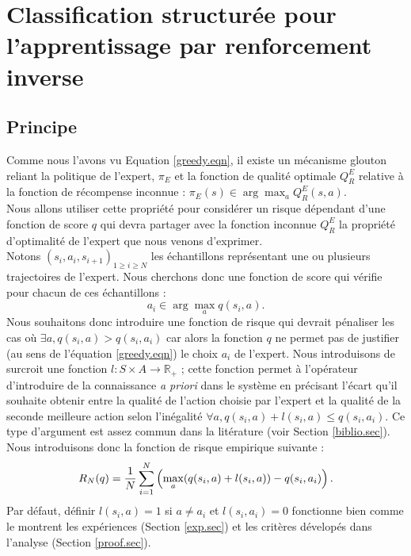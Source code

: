 \documentclass[publibook-draft]{CAp2012}
\begin{document}
\section{Classification structurée pour l'apprentissage par renforcement inverse}
\subsection{Principe}
Comme nous l'avons vu Equation \eqref{greedy.eqn}, il existe un mécanisme glouton reliant la politique de l'expert, $\pi_E$ et la fonction de qualité optimale $Q^E_R$ relative à la fonction de récompense inconnue : $\pi_E(s) \in \arg\max_aQ^E_R(s,a)$.\\
Nous allons utiliser cette propriété pour considérer un risque dépendant d'une fonction de score $q$ qui devra partager avec la fonction inconnue $Q^E_R$ la propriété d'optimalité de l'expert que nous venons d'exprimer.\\
Notons $(s_i,a_i,s_{i+1})_{1\geq i\geq N}$ les échantillons représentant une ou plusieurs trajectoires de l'expert. Nous cherchons donc une fonction de score qui vérifie pour chacun de ces échantillons :
\begin{equation}
\label{butLAFEM.eqn}
a_i \in \arg\max_aq(s_i,a).
\end{equation}
Nous souhaitons donc introduire une fonction de risque qui devrait pénaliser les cas où $\exists a, q(s_i,a)>q(s_i,a_i)$ car alors la fonction $q$ ne permet pas de justifier (au sens de l'équation \eqref{greedy.eqn}) le choix $a_i$ de l'expert. Nous introduisons de surcroit une fonction $l : S \times A \rightarrow \mathbb{R}_+$ ; cette fonction permet à l'opérateur d'introduire de la connaissance \emph{a priori} dans le système en précisant l'écart qu'il souhaite obtenir entre la qualité de l'action choisie par l'expert et la qualité de la seconde meilleure action selon l'inégalité $\forall a, q(s_i,a) + l(s_i,a) \leq q(s_i,a_i)$. Ce type d'argument est assez commun dans la litérature (voir Section \ref{biblio.sec}). Nous introduisons donc la fonction de risque empirique suivante :
  \begin{equation}
   R_N(q) = {1\over N} \sum_{i=1}^N\left(\max_{a}(q(s_i,a) + l(s_i,a)) - q(s_i,a_i) \right).
   \end{equation}
Par défaut, définir $l(s_i,a) = 1$ si $a\neq a_i$ et $l(s_i,a_i)=0$ fonctionne bien comme le montrent les expériences (Section \ref{exp.sec}) et les critères dévelopés dans l'analyse (Section \ref{proof.sec}).\\
\end{document}
